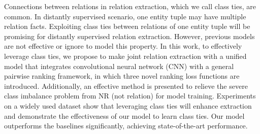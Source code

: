 Connections between relations in relation extraction, which we call class ties, are common. In distantly supervised scenario, one entity tuple may have multiple relation facts. Exploiting class ties between relations of one entity tuple will be promising for distantly supervised relation extraction. However, previous models are not effective or ignore to model this property. In this work, to effectively leverage class ties, we propose to make joint relation extraction with a unified model that integrates convolutional neural network (CNN) with a general pairwise ranking framework, in which three novel ranking loss functions are introduced. Additionally, an effective method is presented to relieve the severe class imbalance problem from NR (not relation) for model training. Experiments on a widely used dataset show that leveraging class ties will enhance extraction and demonstrate the effectiveness of our model to learn class ties. Our model outperforms the baselines significantly, achieving state-of-the-art performance.
